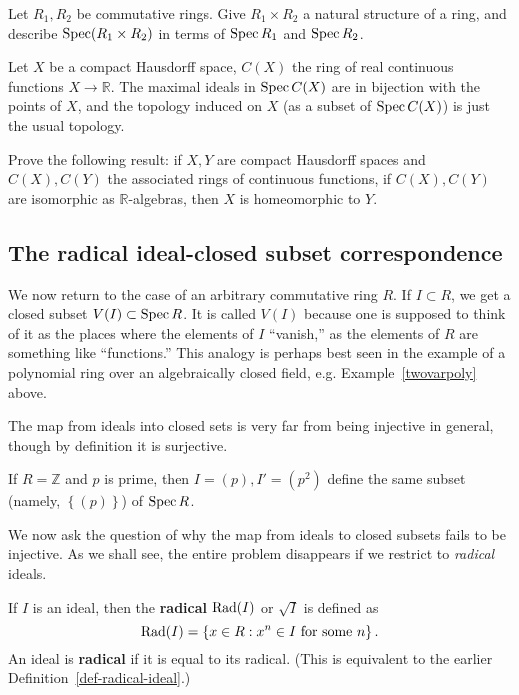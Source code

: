 \begin{exercise} 
Let $R_1, R_2$ be commutative rings. Give $R_1 \times R_2$ a
natural structure
of a ring, and describe $\operatorname{Spec}( R_1 \times R_2)$ in terms of
$\operatorname{Spec} R_1$ and
$\operatorname{Spec} R_2$.
\end{exercise} 


\begin{exercise} 
Let $X$ be a compact Hausdorff space, $C(X)$ the ring of real
continuous
functions $X \to \mathbb{R}$. 
The maximal ideals in $\operatorname{Spec} C(X)$ are in bijection with the
points of $X$,
and the topology induced on $X $ (as a subset of $\operatorname{Spec} C(X)$)
is just the usual topology.
\end{exercise}

\begin{exercise}
Prove the following result: if $X, Y$ are compact Hausdorff
spaces and $C(X),
C(Y)$ the associated rings of continuous functions, if $C(X),
C(Y)$ are
isomorphic as $\mathbb{R}$-algebras, then $X$ is homeomorphic to
$Y$.
\end{exercise} 


\subsection{The radical ideal-closed subset correspondence}

We now return to the case of an arbitrary commutative ring $R$.
If $I \subset R$, we get a closed
subset $V(I) \subset \operatorname{Spec} R$. It is called $V(I)$ because one
is supposed to
think of it as the places where the elements of $I$ ``vanish,''
as the
elements of $R$ are something like ``functions.'' This analogy
is perhaps best
seen in the example of a polynomial ring over an algebraically
closed field,
e.g. Example~\ref{twovarpoly} above.

The map from ideals into closed sets is very far from being
injective in
general, though by definition it is surjective.

\begin{example} 
If $R = \mathbb{Z}$ and $p$ is prime, then $I = (p), I' = (p^2)$
define the
same subset (namely, $\left\{(p)\right\}$) of
$\operatorname{Spec} R$. 
\end{example} 

We now ask the question of why the map from ideals to closed
subsets fails to
be injective. As we shall see, the entire problem disappears if
we restrict to
\emph{radical} ideals.

\begin{definition} 
If $I$ is an ideal, then the \textbf{radical} $\operatorname{Rad}(I) $ or $
\sqrt{I}$ is
defined as $$\operatorname{Rad}(I) =
\left\{x \in R: x^n \in I \ \mathrm{for} \ \mathrm{some} \ n
\right\}.$$
An ideal is \textbf{radical} if it is equal to its radical.
(This is
equivalent to the earlier Definition~\ref{def-radical-ideal}.) 
\end{definition} 

